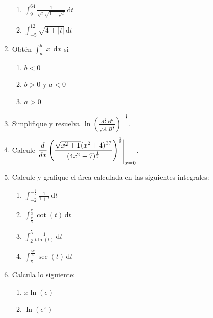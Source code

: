 \documentclass{article}
\makeatletter
\numberwithin{equation}{section}
\newcommand{\integrate}[4]{\int_{#1}^{#2} \! {#3} \, \mathrm{d} {#4} }
\newcommand\eval[1]{\begin{array}[t]{@{}c@{\,}|@{\,}}%
\raisebox{0pt}[0.85\height][1.33\depth]{$ \displaystyle#1 $}\end{array}}
\makeatother
\begin{document}
\begin{enumerate}
\begin{multicols}{2}
            \begin{enumerate}
                \item $\integrate{9}{64}{\frac{1}{\sqrt{t}\sqrt{1+\sqrt{t}}}}{t}$
                \item $\integrate{-5}{12}{\sqrt{4+|t|}}{t}$
            \end{enumerate}
        \end{multicols}
    \item Obtén $\integrate{a}{b}{|x|}{x}$ si
        \begin{multicols}{3}
            \begin{enumerate}
                \item $b<0$
                \item $b>0$ y $a<0$
                \item $a>0$
            \end{enumerate}
        \end{multicols}
    \item Simplifique y resuelva $\ln{\left(\frac{A^{\frac{3}{2}}B^6}{\sqrt{A}B^{\frac{5}{7}}}\right)^{-\frac{1}{3}}}$.
    \item Calcule $\eval{\frac{d}{dx}\left(\frac{\sqrt{x^2+1}(x^2+4)^{37}}{(4x^2+7)^{\frac{1}{3}}}\right)^{\frac{1}{3}}}_{x=0}$.
    \item Calcule y grafique el área calculada en las siguientes integrales:
        \begin{multicols}{4}
            \begin{enumerate}
                \item $\integrate{-2}{-\frac{3}{2}}{\frac{1}{1+t}}{t}$
                \item $\integrate{\frac{\pi}{4}}{\frac{\pi}{3}}{\cot(t)}{t}$
                \item $\integrate{2}{5}{\frac{1}{t\ln (t)}}{t}$
                \item $\integrate{\pi}{\frac{5\pi}{4}}{\sec (t)}{t}$
            \end{enumerate}
        \end{multicols}
    \item Calcula lo siguiente:
        \begin{multicols}{2}
            \begin{enumerate}
                \item $x\ln(e)$
                \item $\ln(e^x)$
            \end{enumerate}

\end{multicols}
\end{enumerate}
\end{document}
